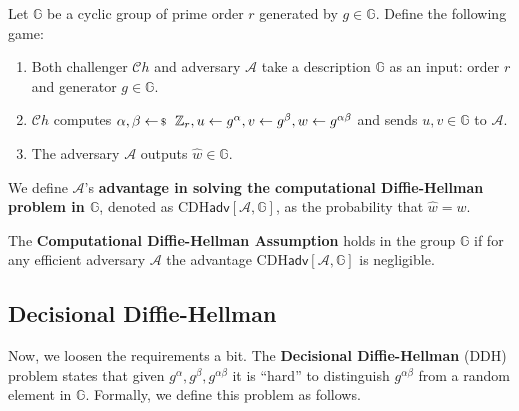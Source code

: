 \documentclass[../lecture-notes-148x210.tex]{subfiles}
\begin{document}
\begin{definition}
    Let $\mathbb{G}$ be a cyclic group of prime order $r$ generated by $g \in \mathbb{G}$. Define the following game:
    \begin{enumerate}
        \item Both challenger $\mathcal{C}h$ and adversary $\mathcal{A}$ take a description $\mathbb{G}$ as an input: order $r$ and generator $g \in \mathbb{G}$.
        \item $\mathcal{C}h$ computes $\alpha, \beta \leftarrowS \mathbb{Z}_r, u \gets g^{\alpha}, v \gets g^{\beta}, w \gets g^{\alpha\beta}$ and sends $u,v \in \mathbb{G}$ to $\mathcal{A}$.
        \item The adversary $\mathcal{A}$ outputs $\hat{w} \in \mathbb{G}$.
    \end{enumerate}

    We define $\mathcal{A}$'s \textbf{advantage in solving the computational Diffie-Hellman problem in $\mathbb{G}$}, 
    denoted as $\text{CDH}\mathsf{adv}[\mathcal{A},\mathbb{G}]$, as the probability that $\hat{w} = w$.
\end{definition}

\begin{definition}
    The \textbf{Computational Diffie-Hellman Assumption} holds in the group $\mathbb{G}$ if for any efficient 
    adversary $\mathcal{A}$ the advantage $\text{CDH}\mathsf{adv}[\mathcal{A},\mathbb{G}]$ is negligible.
\end{definition}

\subsection{Decisional Diffie-Hellman}

Now, we loosen the requirements a bit. The \textbf{Decisional Diffie-Hellman} (DDH) problem \cite[chapter 16]{Dan_Boneh_2023} 
states that given $g^{\alpha},g^{\beta},g^{\alpha\beta}$ it is ``hard'' to distinguish $g^{\alpha\beta}$ from a 
random element in $\mathbb{G}$. Formally, we define this problem as follows.
\end{document}
